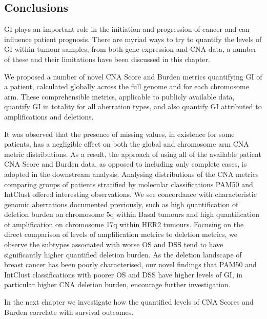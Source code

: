 \subsection{Conclusions}
GI plays an important role in the initiation and progression of cancer and can influence patient prognosis. There are myriad ways to try to quantify the levels of GI within tumour samples, from both gene expression and CNA data, a number of these and their limitations have been discussed in this chapter.

We proposed a number of novel CNA Score and Burden metrics quantifying GI of a patient, calculated globally across the full genome and for each chromosome arm. These comprehensible metrics, applicable to publicly available data, quantify GI in totality for all aberration types, and also quantify GI attributed to amplifications and deletions.

It was observed that the presence of missing values, in existence for some patients, has a negligible effect on both the global and chromosome arm CNA metric distributions. As a result, the approach of using all of the available patient CNA Score and Burden data, as opposed to including only complete cases, is adopted in the downstream analysis. Analysing distributions of the CNA metrics comparing groups of patients stratified by molecular classifications PAM50 and IntClust offered interesting observations. We see concordance with characteristic genomic aberrations documented previously, such as high quantification of deletion burden on chromosome 5q within Basal tumours and high quantification of amplification on chromosome 17q within HER2 tumours. Focusing on the direct comparison of levels of amplification metrics to deletion metrics, we observe the subtypes associated with worse OS and DSS tend to have significantly higher quantified deletion burden. As the deletion landscape of breast cancer has been poorly characterised, our novel findings that PAM50 and IntClust classifications with poorer OS and DSS have higher levels of GI, in particular higher CNA deletion burden, encourage further investigation.

In the next chapter we investigate how the quantified levels of CNA Scores and Burden correlate with survival outcomes. 
